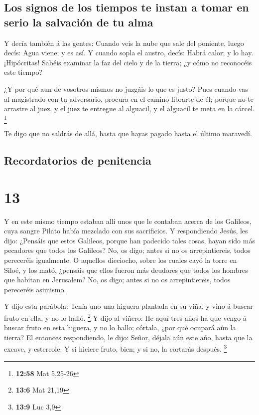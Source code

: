 \hypertarget{los-signos-de-los-tiempos-te-instan-a-tomar-en-serio-la-salvaciuxf3n-de-tu-alma}{%
\subsection{Los signos de los tiempos te instan a tomar en serio la
salvación de tu
alma}\label{los-signos-de-los-tiempos-te-instan-a-tomar-en-serio-la-salvaciuxf3n-de-tu-alma}}

 Y decía también á las gentes: Cuando veis la nube que sale
del poniente, luego decís: Agua viene; y es así.  Y cuando
sopla el austro, decís: Habrá calor; y lo hay. 
¡Hipócritas! Sabéis examinar la faz del cielo y de la tierra; ¿y cómo no
reconocéis este tiempo?

 ¿Y por qué aun de vosotros mismos no juzgáis lo que es
justo?  Pues cuando vas al magistrado con tu adversario,
procura en el camino librarte de él; porque no te arrastre al juez, y el
juez te entregue al alguacil, y el alguacil te meta en la cárcel.
\footnote{\textbf{12:58} Mat 5,25-26}

 Te digo que no saldrás de allá, hasta que hayas pagado
hasta el último maravedí.

\hypertarget{recordatorios-de-penitencia}{%
\subsection{Recordatorios de
penitencia}\label{recordatorios-de-penitencia}}

\hypertarget{section-12}{%
\section{13}\label{section-12}}

 Y en este mismo tiempo estaban allí unos que le contaban
acerca de los Galileos, cuya sangre Pilato había mezclado con sus
sacrificios.  Y respondiendo Jesús, les dijo: ¿Pensáis que
estos Galileos, porque han padecido tales cosas, hayan sido más
pecadores que todos los Galileos?  No, os digo; antes si no
os arrepintiereis, todos pereceréis igualmente.  O aquellos
dieciocho, sobre los cuales cayó la torre en Siloé, y los mató, ¿pensáis
que ellos fueron más deudores que todos los hombres que habitan en
Jerusalem?  No, os digo; antes si no os arrepintiereis,
todos pereceréis asimismo.

 Y dijo esta parábola: Tenía uno una higuera plantada en su
viña, y vino á buscar fruto en ella, y no lo halló. \footnote{\textbf{13:6}
  Mat 21,19}  Y dijo al viñero: He aquí tres años ha que
vengo á buscar fruto en esta higuera, y no lo hallo; córtala, ¿por qué
ocupará aún la tierra?  El entonces respondiendo, le dijo:
Señor, déjala aún este año, hasta que la excave, y estercole.
 Y si hiciere fruto, bien; y si no, la cortarás después.
\footnote{\textbf{13:9} Luc 3,9}


